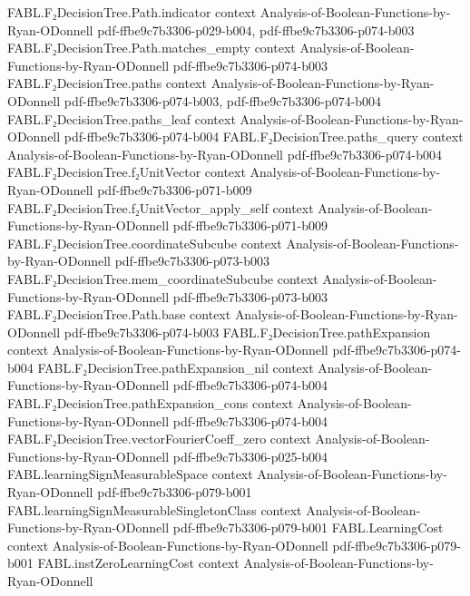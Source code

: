 \begin{theorem}
\proofstep
  {FABL.F₂DecisionTree.Path.indicator}
  {context}
  {Analysis-of-Boolean-Functions-by-Ryan-ODonnell}
  {pdf-ffbe9c7b3306-p029-b004,
    pdf-ffbe9c7b3306-p074-b003}
\proofstep
  {FABL.F₂DecisionTree.Path.matches_empty}
  {context}
  {Analysis-of-Boolean-Functions-by-Ryan-ODonnell}
  {pdf-ffbe9c7b3306-p074-b003}
\proofstep
  {FABL.F₂DecisionTree.paths}
  {context}
  {Analysis-of-Boolean-Functions-by-Ryan-ODonnell}
  {pdf-ffbe9c7b3306-p074-b003,
    pdf-ffbe9c7b3306-p074-b004}
\proofstep
  {FABL.F₂DecisionTree.paths_leaf}
  {context}
  {Analysis-of-Boolean-Functions-by-Ryan-ODonnell}
  {pdf-ffbe9c7b3306-p074-b004}
\proofstep
  {FABL.F₂DecisionTree.paths_query}
  {context}
  {Analysis-of-Boolean-Functions-by-Ryan-ODonnell}
  {pdf-ffbe9c7b3306-p074-b004}
\proofstep
  {FABL.F₂DecisionTree.f₂UnitVector}
  {context}
  {Analysis-of-Boolean-Functions-by-Ryan-ODonnell}
  {pdf-ffbe9c7b3306-p071-b009}
\proofstep
  {FABL.F₂DecisionTree.f₂UnitVector_apply_self}
  {context}
  {Analysis-of-Boolean-Functions-by-Ryan-ODonnell}
  {pdf-ffbe9c7b3306-p071-b009}
\proofstep
  {FABL.F₂DecisionTree.coordinateSubcube}
  {context}
  {Analysis-of-Boolean-Functions-by-Ryan-ODonnell}
  {pdf-ffbe9c7b3306-p073-b003}
\proofstep
  {FABL.F₂DecisionTree.mem_coordinateSubcube}
  {context}
  {Analysis-of-Boolean-Functions-by-Ryan-ODonnell}
  {pdf-ffbe9c7b3306-p073-b003}
\proofstep
  {FABL.F₂DecisionTree.Path.base}
  {context}
  {Analysis-of-Boolean-Functions-by-Ryan-ODonnell}
  {pdf-ffbe9c7b3306-p074-b003}
\proofstep
  {FABL.F₂DecisionTree.pathExpansion}
  {context}
  {Analysis-of-Boolean-Functions-by-Ryan-ODonnell}
  {pdf-ffbe9c7b3306-p074-b004}
\proofstep
  {FABL.F₂DecisionTree.pathExpansion_nil}
  {context}
  {Analysis-of-Boolean-Functions-by-Ryan-ODonnell}
  {pdf-ffbe9c7b3306-p074-b004}
\proofstep
  {FABL.F₂DecisionTree.pathExpansion_cons}
  {context}
  {Analysis-of-Boolean-Functions-by-Ryan-ODonnell}
  {pdf-ffbe9c7b3306-p074-b004}
\proofstep
  {FABL.F₂DecisionTree.vectorFourierCoeff_zero}
  {context}
  {Analysis-of-Boolean-Functions-by-Ryan-ODonnell}
  {pdf-ffbe9c7b3306-p025-b004}
\proofstep
  {FABL.learningSignMeasurableSpace}
  {context}
  {Analysis-of-Boolean-Functions-by-Ryan-ODonnell}
  {pdf-ffbe9c7b3306-p079-b001}
\proofstep
  {FABL.learningSignMeasurableSingletonClass}
  {context}
  {Analysis-of-Boolean-Functions-by-Ryan-ODonnell}
  {pdf-ffbe9c7b3306-p079-b001}
\proofstep
  {FABL.LearningCost}
  {context}
  {Analysis-of-Boolean-Functions-by-Ryan-ODonnell}
  {pdf-ffbe9c7b3306-p079-b001}
\proofstep
  {FABL.instZeroLearningCost}
  {context}
  {Analysis-of-Boolean-Functions-by-Ryan-ODonnell}

\end{theorem}
